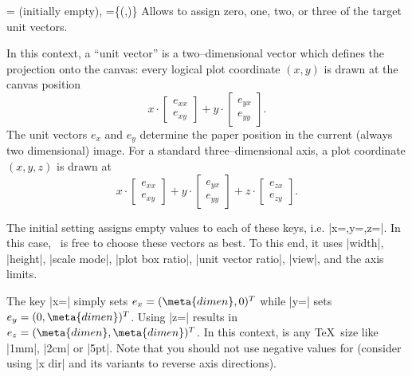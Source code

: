 \begin{pgfplotsxykeylist}{
	\x= (initially empty),
	\x={\{(,)\}}}
Allows to assign zero, one, two, or three of the target unit vectors. 
%
%
%
%
%
%

In this context, a ``unit vector'' is a two--dimensional vector which defines the projection onto the canvas:
every logical plot coordinate $(x,y)$ is drawn at the canvas position
\[ x \cdot \begin{bmatrix} e_{xx} \\ e_{xy} \end{bmatrix} + y \cdot \begin{bmatrix} e_{yx} \\ e_{yy} \end{bmatrix}. \]
The unit vectors $e_x$ and $e_y$ determine the paper position in the current (always two dimensional) image.
For a standard three--dimensional axis, a plot coordinate $(x,y,z)$ is drawn at 
\[ x \cdot \begin{bmatrix} e_{xx} \\ e_{xy} \end{bmatrix} + y \cdot \begin{bmatrix} e_{yx} \\ e_{yy} \end{bmatrix} + z \cdot \begin{bmatrix} e_{zx} \\ e_{zy} \end{bmatrix}. \]

The initial setting assigns empty values to each of these keys, i.e. |x={},y={},z={}|. In this case, \PGFPlots\ is free to choose these vectors as best. To this end, it uses |width|, |height|, |scale mode|, |plot box ratio|, |unit vector ratio|, |view|, and the axis limits.

The key |x=| simply sets $e_x = (\meta{dimen},0)^T $ while |y=| sets $e_y = (0,\meta{dimen})^T$. Using |z=| results in $e_z = (\meta{dimen},\meta{dimen})^T$. In this context,  is any \TeX\ size like |1mm|, |2cm| or |5pt|. Note that you should not use negative values for  (consider using |x dir| and its variants to reverse axis directions).
\begin{codeexample}[]
\end{codeexample}


\end{pgfplotsxykeylist}
